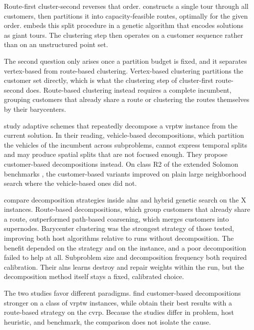 Route-first cluster-second reverses that order. \citet{beasley1983route} constructs a single tour through all customers, then partitions it into capacity-feasible routes, optimally for the given order. \citet{simple_prins_2004} embeds this split procedure in a genetic algorithm that encodes solutions as giant tours. The clustering step then operates on a customer sequence rather than on an unstructured point set.

The second question only arises once a partition budget is fixed, and it separates vertex-based from route-based clustering. Vertex-based clustering partitions the customer set directly, which is what the clustering step of cluster-first route-second does. Route-based clustering instead requires a complete incumbent, grouping customers that already share a route or clustering the routes themselves by their barycenters.

\citet{bent2010spatial} study adaptive schemes that repeatedly decompose a \gls{vrptw} instance from the current solution. In their reading, vehicle-based decompositions, which partition the vehicles of the incumbent across subproblems, cannot express temporal splits and may produce spatial splits that are not focused enough. They propose customer-based decompositions instead. On class R2 of the extended Solomon benchmarks \citep{solomonAlgorithmsVehicleRouting1987}, the customer-based variants improved on plain large neighborhood search where the vehicle-based ones did not.

\citet{santiniDecompositionStrategiesVehicle2023} compare decomposition strategies inside \gls{alns} \citep{pisingerGeneralHeuristicVehicle2007} and hybrid genetic search \citep{vidalHybridGeneticAlgorithm2012} on the X instances. Route-based decompositions, which group customers that already share a route, outperformed path-based coarsening, which merges customers into supernodes. Barycenter clustering was the strongest strategy of those tested, improving both host algorithms relative to runs without decomposition. The benefit depended on the strategy and on the instance, and a poor decomposition failed to help at all. Subproblem size and decomposition frequency both required calibration. Their \gls{alns} learns destroy and repair weights within the run, but the decomposition method itself stays a fixed, calibrated choice.

The two studies favor different paradigms. \citet{bent2010spatial} find customer-based decompositions stronger on a class of \gls{vrptw} instances, while \citet{santiniDecompositionStrategiesVehicle2023} obtain their best results with a route-based strategy on the \gls{cvrp}\@. Because the studies differ in problem, host heuristic, and benchmark, the comparison does not isolate the cause.

